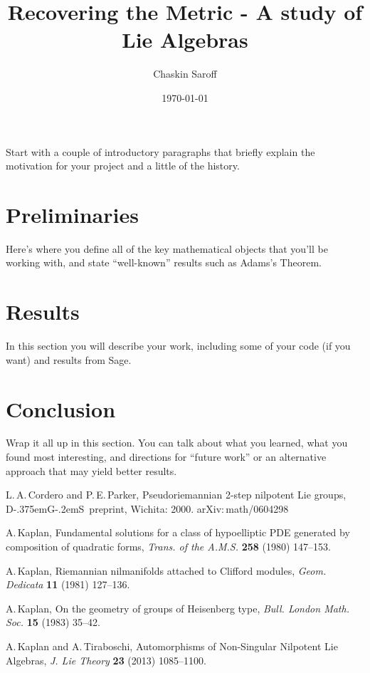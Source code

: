 \documentclass[11 pt]{article}
\title{Recovering the Metric - A study of Lie Algebras}
\author{Chaskin Saroff}
\date{\today} \draft
\newcommand{\DGS}{D{\kern-.375em}G{\kern-.2em}S}
\begin{document}
\maketitle


Start with a couple of introductory paragraphs that briefly explain the
motivation for your project and a little of the history.



\section{Preliminaries}

Here's where you define all of the key mathematical objects that you'll
be working with, and state ``well-known'' results such as Adams's Theorem.


\section{Results}

In this section you will describe your work, including some of your code (if
you want) and results from Sage.

\section{Conclusion}

Wrap it all up in this section. You can talk about what you learned, what
you found most interesting, and directions for ``future work'' or an alternative
approach that may yield better results.

\begin{thebibliography}{99}
L.\,A.\,Cordero and P.\,E.\,Parker, Pseudoriemannian 2-step
nilpotent Lie groups, \DGS\ preprint, Wichita: 2000.
{\sf arXiv:\,math/0604298}

A.\,Kaplan, Fundamental solutions for a class of hypoelliptic PDE
generated by composition of quadratic forms, {\it Trans. of the A.M.S.} {\bf 258}
(1980) 147--153.

A.\,Kaplan, Riemannian nilmanifolds attached to Clifford modules,
{\it Geom. Dedicata} {\bf 11} (1981) 127--136.

A.\,Kaplan, On the geometry of groups of Heisenberg type, {\it Bull.
London Math. Soc.} {\bf 15} (1983) 35--42.

A.\,Kaplan and A.\,Tiraboschi, Automorphisms of Non-Singular
Nilpotent Lie Algebras, {\it J. Lie Theory} {\bf 23} (2013) 1085--1100.
\end{thebibliography}
\end{document}
